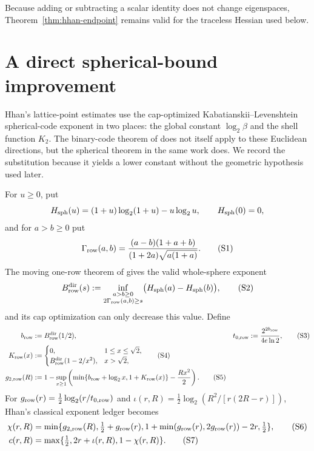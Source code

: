 \documentclass[10pt]{article}
\theoremstyle{definition}
\begin{document}
Because adding or subtracting a scalar identity does not change eigenspaces,
Theorem~\ref{thm:hhan-endpoint} remains valid for the traceless Hessian used
below.

\section{A direct spherical-bound improvement}                   \label{sec:spherical-transfer}

Hhan's lattice-point estimates use the cap-optimized
Kabatianskii--Levenshtein spherical-code exponent in two places: the global
constant $\log_2\beta$ and the shell function $K_2$.  The binary-code theorem
of \cite{OpenAI26} does not itself apply to these Euclidean directions, but
the spherical theorem in the same work does.  We record the substitution
because it yields a lower constant without the geometric hypothesis used
later.

For $u\ge0$, put
\[
 H_{\rm sph}(u)=(1+u)\log_2(1+u)-u\log_2u,
 \qquad H_{\rm sph}(0)=0,
\]
and for $a>b\ge0$ put
\[
 \Gamma_{\rm row}(a,b)
 =\frac{(a-b)(1+a+b)}{(1+2a)\sqrt{a(1+a)}}.                       \tag{S1}
\]
The moving one-row theorem of \cite[Chapter 2]{OpenAI26} gives the valid
whole-sphere exponent
\[
 B_{\rm row}^{\rm dir}(s)
 :=\inf_{\substack{a>b\ge0\\2\Gamma_{\rm row}(a,b)\ge s}}
     \bigl(H_{\rm sph}(a)-H_{\rm sph}(b)\bigr),                  \tag{S2}
\]
and its cap optimization can only decrease this value.  Define
\begin{align}
 b_{\rm row}&:=B_{\rm row}^{\rm dir}(1/2),
 &t_{0,{\rm row}}&:=\frac{2^{2b_{\rm row}}}{4e\ln2},             \tag{S3}\\
 K_{\rm row}(x)&:=
 \begin{cases}
 0,&1\le x\le\sqrt2,\\
 B_{\rm row}^{\rm dir}(1-2/x^2),&x>\sqrt2,
 \end{cases}                                                     \tag{S4}\\
 g_{2,{\rm row}}(R)&:=1-\sup_{x\ge1}
 \left(\min\{b_{\rm row}+\log_2x,1+K_{\rm row}(x)\}
       -\frac{Rx^2}{2}\right).                                  \tag{S5}
\end{align}
For $g_{\rm row}(r)=\tfrac12\log_2(r/t_{0,{\rm row}})$ and
$\iota(r,R)=\tfrac12\log_2(R^2/[r(2R-r)])$, Hhan's classical exponent
ledger becomes
\begin{align}
 \chi(r,R)&=\min\{g_{2,{\rm row}}(R),\tfrac12+g_{\rm row}(r),
 1+\min(g_{\rm row}(r),2g_{\rm row}(r))-2r,\tfrac12\},          \tag{S6}\\
 c(r,R)&=\max\{\tfrac12,2r+\iota(r,R),1-\chi(r,R)\}.            \tag{S7}
\end{align}
\end{document}
